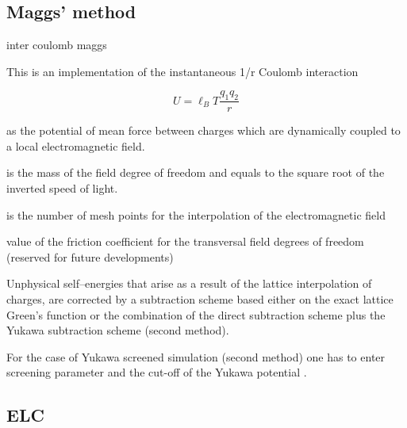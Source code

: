 \subsection{Maggs' method}

\begin{essyntax}
  inter coulomb 
  maggs   
\end{essyntax}

This is an implementation of the instantaneous 1/r Coulomb interaction

\[ U = \ell_B T \frac{q_1 q_2}{r} \]

as the potential of mean force between charges which are dynamically
coupled to a local electromagnetic field.

 is the mass of the field degree of freedom and equals to
the square root of the inverted speed of light.

 is the number of mesh points for the interpolation of the
electromagnetic field

 value of the friction coefficient for the
transversal field degrees of freedom (reserved for future
developments)

Unphysical self--energies that arise as a result of the lattice
interpolation of charges, are corrected by a subtraction scheme based
either on the exact lattice Green's function or the combination of the
direct subtraction scheme plus the Yukawa subtraction scheme (second
method).

For the case of Yukawa screened simulation (second method) one has to
enter screening parameter  and the cut-off of the Yukawa
potential .

\subsection{ELC}

